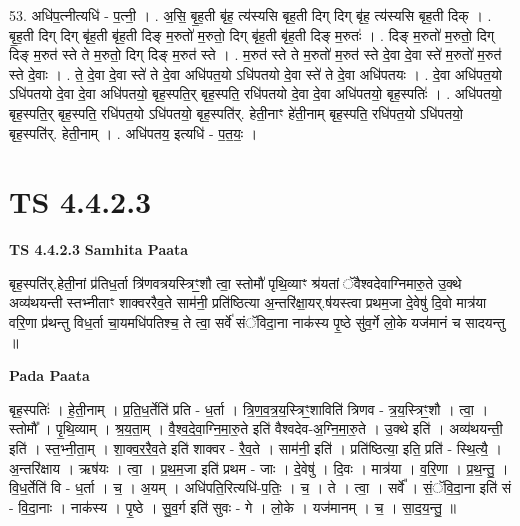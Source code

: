 \documentclass[17pt]{extarticle}
\begin{document}
53. अधि॑प॒त्नीत्यधि॑ - प॒त्नी॒ । . अ॒सि॒ बृ॒ह॒ती बृ॑ह॒ त्य॑स्यसि बृह॒ती दिग् दिग् बृ॑ह॒ त्य॑स्यसि बृह॒ती दिक् । . बृ॒ह॒ती दिग् दिग् बृ॑ह॒ती बृ॑ह॒ती दिङ् म॒रुतो॑ म॒रुतो॒ दिग् बृ॑ह॒ती बृ॑ह॒ती दिङ् म॒रुतः॑ । . दिङ् म॒रुतो॑ म॒रुतो॒ दिग् दिङ् म॒रुत॑ स्ते ते म॒रुतो॒ दिग् दिङ् म॒रुत॑ स्ते । . म॒रुत॑ स्ते ते म॒रुतो॑ म॒रुत॑ स्ते दे॒वा दे॒वा स्ते॑ म॒रुतो॑ म॒रुत॑ स्ते दे॒वाः । . ते॒ दे॒वा दे॒वा स्ते॑ ते दे॒वा अधि॑पत॒यो ऽधि॑पतयो दे॒वा स्ते॑ ते दे॒वा अधि॑पतयः । . दे॒वा अधि॑पत॒यो ऽधि॑पतयो दे॒वा दे॒वा अधि॑पतयो॒ बृह॒स्पति॒र् बृह॒स्पति॒ रधि॑पतयो दे॒वा दे॒वा अधि॑पतयो॒ बृह॒स्पतिः॑ । . अधि॑पतयो॒ बृह॒स्पति॒र् बृह॒स्पति॒ रधि॑पत॒यो ऽधि॑पतयो॒ बृह॒स्पति॑र्. हेती॒नाꣳ हे॑ती॒नाम् बृह॒स्पति॒ रधि॑पत॒यो ऽधि॑पतयो॒ बृह॒स्पति॑र्. हेती॒नाम् । . अधि॑पतय॒ इत्यधि॑ - प॒त॒यः॒ । \newline
\pagebreak
{}

\section{ TS 4.4.2.3 }

\textbf{TS 4.4.2.3 } \newline
\textbf{Samhita Paata} \newline

बृह॒स्पति॑र्.हेती॒नां प्र॑तिध॒र्ता त्रि॑णवत्रयस्त्रिꣳ॒॒शौ त्वा॒ स्तोमौ॑ पृथि॒व्याꣳ श्र॑यतां ॅवैश्वदेवाग्निमारु॒ते उ॒क्थे अव्य॑थयन्ती स्तभ्नीताꣳ शाक्वररैव॒ते साम॑नी॒ प्रति॑ष्ठित्या अ॒न्तरि॑क्षा॒यर्.ष॑यस्त्वा प्रथम॒जा दे॒वेषु॑ दि॒वो मात्र॑या वरि॒णा प्र॑थन्तु विध॒र्ता चा॒यमधि॑पतिश्च॒ ते त्वा॒ सर्वे॑ संॅविदा॒ना नाक॑स्य पृ॒ष्ठे सु॑व॒र्गे लो॒के यज॑मानं च सादयन्तु ॥ \newline

\textbf{Pada Paata} \newline

बृह॒स्पतिः॑ । हे॒ती॒नाम् । प्र॒ति॒ध॒र्तेति॑ प्रति - ध॒र्ता । त्रि॒ण॒व॒त्र॒य॒स्त्रिꣳ॒॒शाविति॑ त्रिणव - त्र॒य॒स्त्रिꣳ॒॒शौ । त्वा॒ । स्तोमौ᳚ । पृ॒थि॒व्याम् । श्र॒य॒ता॒म् । वै॒श्व॒दे॒वा॒ग्नि॒मा॒रु॒ते इति॑ वैश्वदेव-अ॒ग्नि॒मा॒रु॒ते । उ॒क्थे इति॑ । अव्य॑थयन्ती॒ इति॑ । स्त॒भ्नी॒ता॒म् । शा॒क्व॒र॒रै॒व॒ते इति॑ शाक्वर - रै॒व॒ते । साम॑नी॒ इति॑ । प्रति॑ष्ठित्या॒ इति॒ प्रति॑ - स्थि॒त्यै॒ । अ॒न्तरि॑क्षाय । ऋष॑यः । त्वा॒ । प्र॒थ॒म॒जा इति॑ प्रथम - जाः । दे॒वेषु॑ । दि॒वः । मात्र॑या । व॒रि॒णा । प्र॒थ॒न्तु॒ । वि॒ध॒र्तेति॑ वि - ध॒र्ता । च॒ । अ॒यम् । अधि॑पति॒रित्यधि॑-प॒तिः॒ । च॒ । ते । त्वा॒ । सर्वे᳚ । सं॒ॅवि॒दा॒ना इति॑ सं - वि॒दा॒नाः । नाक॑स्य । पृ॒ष्ठे । सु॒व॒र्ग इति॑ सुवः - गे । लो॒के । यज॑मानम् । च॒ । सा॒द॒य॒न्तु॒ ॥  \newline
\end{document}
